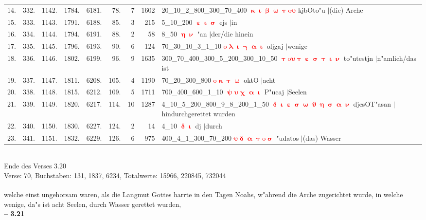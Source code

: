 \documentclass[a4paper,10pt,landscape]{article}
\begin{document}
\begin{tabular}{rrrrrrrrp{120mm}}
14.&332.&1142.&1784.&6181.&78.&7&1602&20\_10\_2\_800\_300\_70\_400 \textcolor{red}{$\boldsymbol{\upkappa\upiota\upbeta\upomega\uptau\mathrm{o}\upsilon}$} kjbOto"u $|$(die) Arche\\
15.&333.&1143.&1791.&6188.&85.&3&215&5\_10\_200 \textcolor{red}{$\boldsymbol{\upepsilon\upiota\upsigma}$} ejs $|$in\\
16.&334.&1144.&1794.&6191.&88.&2&58&8\_50 \textcolor{red}{$\boldsymbol{\upeta\upnu}$} "an $|$der/die hinein\\
17.&335.&1145.&1796.&6193.&90.&6&124&70\_30\_10\_3\_1\_10 \textcolor{red}{$\boldsymbol{\mathrm{o}\uplambda\upiota\upgamma\upalpha\upiota}$} oljgaj $|$wenige\\
18.&336.&1146.&1802.&6199.&96.&9&1635&300\_70\_400\_300\_5\_200\_300\_10\_50 \textcolor{red}{$\boldsymbol{\uptau\mathrm{o}\upsilon\uptau\upepsilon\upsigma\uptau\upiota\upnu}$} to"utestjn $|$n"amlich/das ist\\
19.&337.&1147.&1811.&6208.&105.&4&1190&70\_20\_300\_800 \textcolor{red}{$\boldsymbol{\mathrm{o}\upkappa\uptau\upomega}$} oktO $|$acht\\
20.&338.&1148.&1815.&6212.&109.&5&1711&700\_400\_600\_1\_10 \textcolor{red}{$\boldsymbol{\uppsi\upsilon\upchi\upalpha\upiota}$} P"ucaj $|$Seelen\\
21.&339.&1149.&1820.&6217.&114.&10&1287&4\_10\_5\_200\_800\_9\_8\_200\_1\_50 \textcolor{red}{$\boldsymbol{\updelta\upiota\upepsilon\upsigma\upomega\upvartheta\upeta\upsigma\upalpha\upnu}$} djesOT"asan $|$hindurchgerettet wurden\\
22.&340.&1150.&1830.&6227.&124.&2&14&4\_10 \textcolor{red}{$\boldsymbol{\updelta\upiota}$} dj $|$durch\\
23.&341.&1151.&1832.&6229.&126.&6&975&400\_4\_1\_300\_70\_200 \textcolor{red}{$\boldsymbol{\upsilon\updelta\upalpha\uptau\mathrm{o}\upsigma}$} "udatos $|$(das) Wasser\\
\end{tabular}\medskip \\
Ende des Verses 3.20\\
Verse: 70, Buchstaben: 131, 1837, 6234, Totalwerte: 15966, 220845, 732044\\
\\
welche einst ungehorsam waren, als die Langmut Gottes harrte in den Tagen Noahs, w"ahrend die Arche zugerichtet wurde, in welche wenige, da"s ist acht Seelen, durch Wasser gerettet wurden,\\
\newpage 
{\bf -- 3.21}\\
\medskip \\
\end{document}
